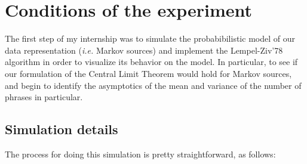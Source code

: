 






\medskip

\section{Conditions of the experiment}

The first step of my internship was to simulate the probabibilistic
model of our data representation (\emph{i.e.} Markov sources) and 
implement the Lempel-Ziv'78 algorithm in order to visualize its 
behavior on the model. In particular, to see if our formulation of the
Central Limit Theorem would hold for Markov sources, and begin to 
identify the asymptotics of the mean and variance of the number 
of phrases in particular.

\subsection{Simulation details}

The process for doing this simulation is pretty straightforward, 
as follows:
	
